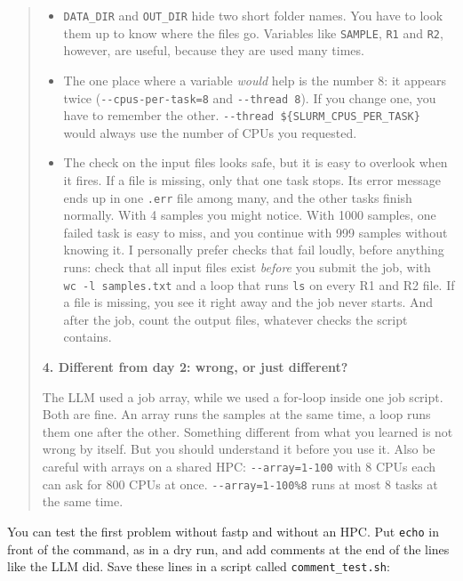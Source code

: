\documentclass[
  letterpaper,
  DIV=11,
  numbers=noendperiod]{scrreprt}
\providecommand{\tightlist}{%
  \setlength{\itemsep}{0pt}\setlength{\parskip}{0pt}}
\begin{document}
\begin{tcolorbox}
\begin{quote}
\begin{itemize}
\tightlist
\item
  \texttt{DATA\_DIR} and \texttt{OUT\_DIR} hide two short folder names.
  You have to look them up to know where the files go. Variables like
  \texttt{SAMPLE}, \texttt{R1} and \texttt{R2}, however, are useful,
  because they are used many times.
\item
  The one place where a variable \emph{would} help is the number 8: it
  appears twice (\texttt{-\/-cpus-per-task=8} and
  \texttt{-\/-thread\ 8}). If you change one, you have to remember the
  other. \texttt{-\/-thread\ \$\{SLURM\_CPUS\_PER\_TASK\}} would always
  use the number of CPUs you requested.
\item
  The check on the input files looks safe, but it is easy to overlook
  when it fires. If a file is missing, only that one task stops. Its
  error message ends up in one \texttt{.err} file among many, and the
  other tasks finish normally. With 4 samples you might notice. With
  1000 samples, one failed task is easy to miss, and you continue with
  999 samples without knowing it. I personally prefer checks that fail
  loudly, before anything runs: check that all input files exist
  \emph{before} you submit the job, with \texttt{wc\ -l\ samples.txt}
  and a loop that runs \texttt{ls} on every R1 and R2 file. If a file is
  missing, you see it right away and the job never starts. And after the
  job, count the output files, whatever checks the script contains.
\end{itemize}

\textbf{4. Different from day 2: wrong, or just different?}

The LLM used a job array, while we used a for-loop inside one job
script. Both are fine. An array runs the samples at the same time, a
loop runs them one after the other. Something different from what you
learned is not wrong by itself. But you should understand it before you
use it. Also be careful with arrays on a shared HPC:
\texttt{-\/-array=1-100} with 8 CPUs each can ask for 800 CPUs at once.
\texttt{-\/-array=1-100\%8} runs at most 8 tasks at the same time.
\end{quote}

\end{tcolorbox}

You can test the first problem without fastp and without an HPC. Put
\texttt{echo} in front of the command, as in a dry run, and add comments
at the end of the lines like the LLM did. Save these lines in a script
called \texttt{comment\_test.sh}:
\end{document}

